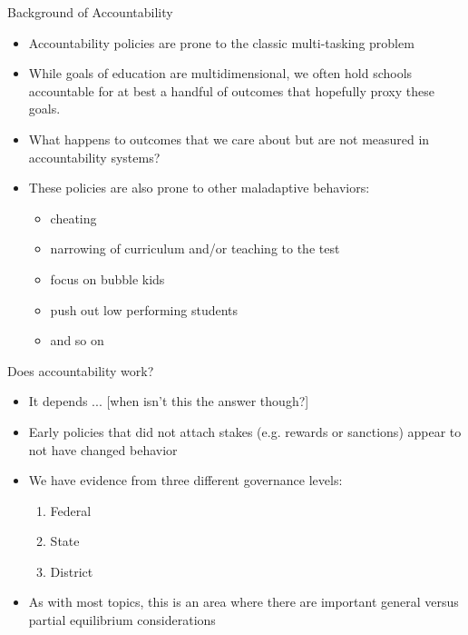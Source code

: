 \documentclass{beamer}
\begin{document}
\begin{frame}[<+->]{Background of Accountability}
	\begin{itemize}
		\item Accountability policies are prone to the classic multi-tasking problem
		\item While goals of education are multidimensional, we often hold schools accountable for at best a handful of outcomes that hopefully proxy these goals. 
		\item What happens to outcomes that we care about but are not measured in accountability systems?
		\item These policies are also prone to other maladaptive behaviors:
			\begin{itemize}
				\item cheating
				\item narrowing of curriculum and/or teaching to the test
				\item focus on bubble kids
				\item push out low performing students
				\item and so on
			\end{itemize} 
	\end{itemize}
\end{frame}


\begin{frame}[<+->]{Does accountability work?}
	\begin{itemize}
		\item It depends ... [when isn't this the answer though?]
		\item Early policies that did not attach stakes (e.g. rewards or sanctions) appear to not have changed behavior
		\item We have evidence from three different governance levels:
			\begin{enumerate}
				\item Federal
				\item State
				\item District
			\end{enumerate}
		\item As with most topics, this is an area where there are important general versus partial equilibrium considerations
	\end{itemize}
	
\end{frame}
\end{document}
